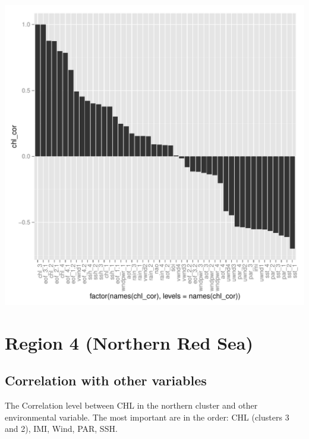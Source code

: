 \documentclass{article}\usepackage[]{graphicx}\usepackage[]{color}
\makeatletter
\def\maxwidth{ %
  \ifdim\Gin@nat@width>\linewidth
    \linewidth
  \else
    \Gin@nat@width
  \fi
}
\newenvironment{kframe}{%
 \def\at@end@of@kframe{}%
 \ifinner\ifhmode%
  \def\at@end@of@kframe{\end{minipage}}%
  \begin{minipage}{\columnwidth}%
 \fi\fi%
 \def\FrameCommand##1{\hskip\@totalleftmargin \hskip-\fboxsep
 \colorbox{shadecolor}{##1}\hskip-\fboxsep
     \hskip-\linewidth \hskip-\@totalleftmargin \hskip\columnwidth}%
 \MakeFramed {\advance\hsize-\width
   \@totalleftmargin\z@ \linewidth\hsize
   \@setminipage}}%
 {\par\unskip\endMakeFramed%
 \at@end@of@kframe}
\newenvironment{knitrout}{}{} %
\makeatother
\begin{document}
\begin{knitrout}
\begin{kframe}
{\ttfamily\noindent\color{warningcolor}{\#\# Warning: Stacking not well defined when ymin != 0}}\end{kframe}
\includegraphics[width=\maxwidth]{figure/unnamed-chunk-35-1} 

\end{knitrout}

\section{Region 4 (Northern Red Sea)}

\subsection{Correlation with other variables}

The Correlation level between CHL in the northern cluster
and other environmental variable.
The most important are in the order: CHL (clusters 3 and 2), IMI, Wind, PAR, SSH.
\end{document}
